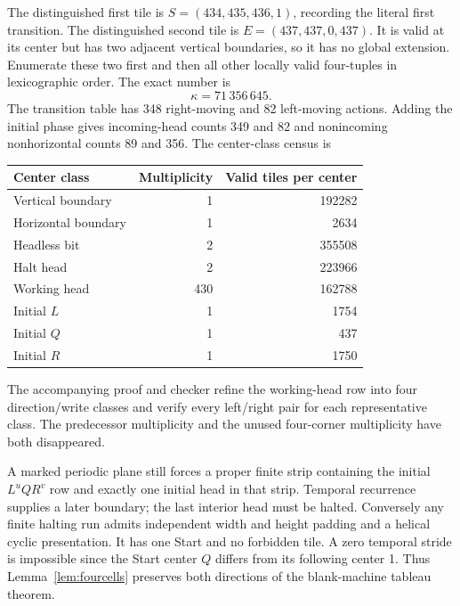 \documentclass[11pt,a4paper]{article}
\theoremstyle{remark}\newtheorem{remark}[theorem]{Remark}
\begin{document}
The distinguished first tile is
\(S=(434,435,436,1)\), recording the literal first transition.
The distinguished second tile is \(E=(437,437,0,437)\). It is
valid at its center but has two adjacent vertical boundaries, so it has
no global extension. Enumerate these two first and then all other
locally valid four-tuples in lexicographic order. The exact number is
\begin{equation}
 \kappa=71\,356\,645.\label{eq:tilecount}
\end{equation}
The transition table has 348 right-moving and 82 left-moving actions.
Adding the initial phase gives incoming-head counts 349 and 82 and
nonincoming nonhorizontal counts 89 and 356. The center-class census is
\begin{center}\small
\begin{tabular}{lrr}
\toprule
Center class & Multiplicity & Valid tiles per center\\
\midrule
Vertical boundary & 1 & 192282\\
Horizontal boundary & 1 & 2634\\
Headless bit & 2 & 355508\\
Halt head & 2 & 223966\\
Working head & 430 & 162788\\
Initial \(L\) & 1 & 1754\\
Initial \(Q\) & 1 & 437\\
Initial \(R\) & 1 & 1750\\
\bottomrule
\end{tabular}
\end{center}
The accompanying proof and checker refine the working-head row into
four direction/write classes and verify every left/right pair for each
representative class. The predecessor multiplicity and the unused
four-corner multiplicity have both disappeared.

A marked periodic plane still forces a proper finite strip containing
the initial \(L^uQR^v\) row and exactly one initial head in that strip.
Temporal recurrence supplies a later boundary; the last interior head
must be halted. Conversely any finite halting run admits independent
width and height padding and a helical cyclic presentation. It has one
Start and no forbidden tile. A zero temporal stride is impossible since
the Start center \(Q\) differs from its following center 1. Thus
Lemma~\ref{lem:fourcells} preserves both directions of the blank-machine
tableau theorem.
\end{document}

